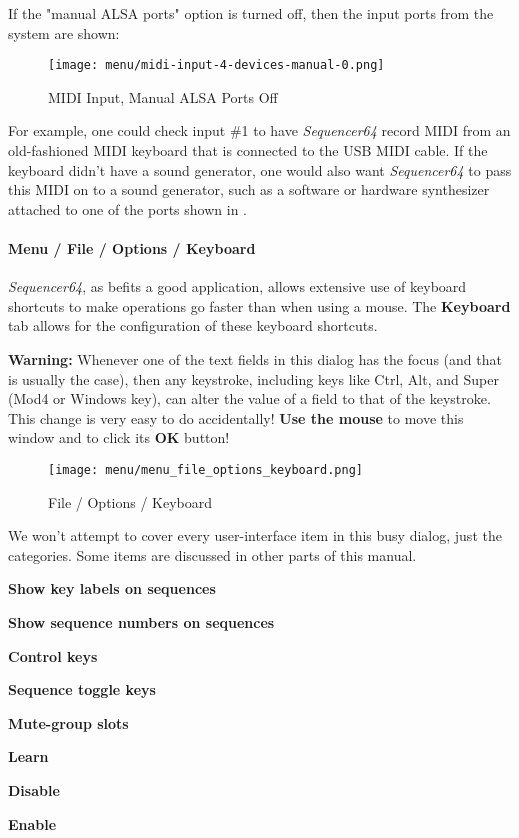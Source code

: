    If the "manual ALSA ports" option is turned off, then
   the input ports from the system are shown:

\begin{figure}[H]
   \centering 
   \texttt{[image: menu/midi-input-4-devices-manual-0.png]}
   \caption{MIDI Input, Manual ALSA Ports Off}
   \label{fig:seq64_midi_input_4_devices_manual_0}
\end{figure}

   For example, one could check input \#1 to have \textsl{Sequencer64} record
   MIDI from an old-fashioned MIDI keyboard that is connected to the USB MIDI
   cable.  If the keyboard didn't have a sound generator, one would also want
   \textsl{Sequencer64} to pass this MIDI on to a sound generator, such as a
   software or hardware synthesizer attached to one of the ports shown in
   .

\paragraph{Menu / File / Options / Keyboard }
\label{paragraph:seq64_menu_file_options_keyboard}

   \textsl{Sequencer64}, as befits a good application, allows extensive use of
   keyboard shortcuts to make operations go faster than when using a mouse.
   The \textbf{Keyboard} tab allows for the configuration of these keyboard
   shortcuts.

   \textbf{Warning:}
   Whenever one of the text fields in this dialog has the focus (and that is
   usually the case), then any keystroke, including keys like Ctrl, Alt,
   and Super (Mod4 or Windows key), can alter the value of a field to that
   of the keystroke.  This change is very easy to do accidentally!
   \textbf{Use the mouse}
   to move this window and to click its \textbf{OK} button!

\begin{figure}[H]
   \centering 
   \texttt{[image: menu/menu\_file\_options\_keyboard.png]}
   \caption{File / Options / Keyboard}
   \label{fig:seq64_menu_file_options_keyboard}
\end{figure}

   We won't attempt to cover every user-interface item in this busy
   dialog, just the categories.  Some items are discussed in other parts of
   this manual.

   \begin{enumber}
      \item \textbf{Show key labels on sequences}
      \item \textbf{Show sequence numbers on sequences}
      \item \textbf{Control keys}
      \item \textbf{Sequence toggle keys}
      \item \textbf{Mute-group slots}
      \item \textbf{Learn}
      \item \textbf{Disable}
      \item \textbf{Enable}
   \end{enumber}

